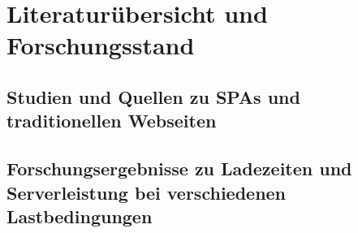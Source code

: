 \section{Literaturübersicht und Forschungsstand}
\subsection{Studien und Quellen zu SPAs und traditionellen Webseiten}
\subsection{Forschungsergebnisse zu Ladezeiten und Serverleistung bei verschiedenen Lastbedingungen}
